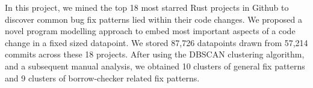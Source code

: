 In this project, we mined the top 18 most starred Rust projects in Github to discover common bug fix patterns lied within their code changes. We proposed a novel program modelling approach to embed most important aspects of a code change in a fixed sized datapoint. We stored 87,726 datapoints drawn from 57,214 commits across these 18 projects. After using the DBSCAN clustering algorithm, and a subsequent manual analysis, we obtained 10 clusters of general fix patterns and 9 clusters of borrow-checker related fix patterns.